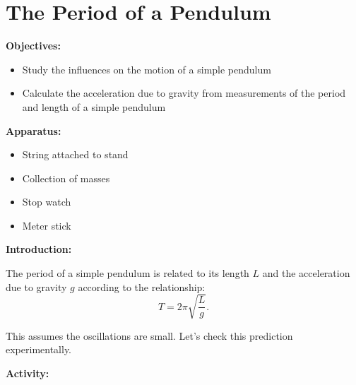 \section{The Period of a Pendulum}

\makelabheader %

\bigskip
\textbf{Objectives:}
\begin{itemize}[nosep]
\item Study the influences on the motion of a simple pendulum 
\item Calculate the acceleration due to gravity from measurements of the period and length of a simple pendulum
\end{itemize}

\bigskip
\textbf{Apparatus:}
\begin{itemize}[nosep]
\item String attached to stand 
\item Collection of masses 
\item Stop watch 
\item Meter stick
\end{itemize}

\bigskip
\textbf{Introduction:}

The period of a simple pendulum is related to its length $L$ and the acceleration due to gravity $g$ according to the relationship:
\begin{equation}
T=2\pi \sqrt{\frac{L}{g}}.
\end{equation}

This assumes the oscillations are small. Let's check this prediction experimentally. 

\bigskip
\textbf{Activity:} 

